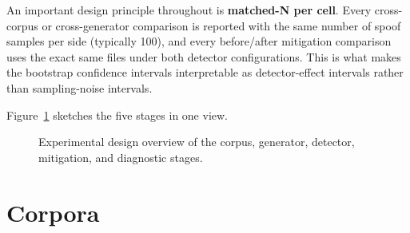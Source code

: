 An important design principle throughout is \textbf{matched-N per cell}.
Every cross-corpus or cross-generator comparison is reported with the
same number of spoof samples per side (typically 100), and every
before/after mitigation comparison uses the exact same files under
both detector configurations. This is what makes the bootstrap
confidence intervals interpretable as detector-effect intervals
rather than sampling-noise intervals.

Figure~\ref{fig:experimental-design-overview} sketches the five stages
in one view.

\begin{figure}[t]
\centering
{}
\caption{Experimental design overview of the corpus, generator, detector, mitigation, and diagnostic stages.}
\label{fig:experimental-design-overview}
\end{figure}


\section{Corpora}
\label{sec:methodology-corpora}

